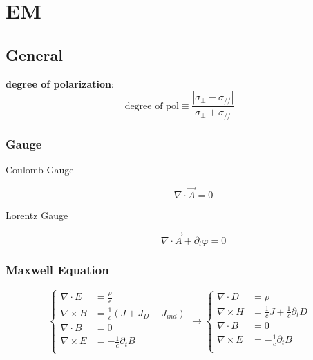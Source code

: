 \section{EM}

\subsection{General}
\textbf{degree of polarization}:    \\
\begin{equation}
    \text{degree of pol} \equiv \frac{|\sigma_{\perp}-\sigma_{//}|}{\sigma_{\perp}+\sigma_{//}}
\end{equation}

\subsubsection{Gauge}
\begin{description}
    \item [Coulomb Gauge]
	\begin{equation}
	    \label{eqn:em::CoulombGauge}
	    \nabla\cdot\vec{A} = 0
	\end{equation}

    \item [Lorentz Gauge]
	\begin{equation}
	    \label{eqn:em::LorentzGauge}
	    \nabla\cdot\vec{A} + \partial_t\varphi = 0
	\end{equation}
\end{description}

\subsubsection{Maxwell Equation}
\begin{equation}
    \label{eqn:Maxwell}
    \left\{
    \begin{aligned}
	\nabla\cdot{E} &= \frac{\rho}{\epsilon}	\\
	\nabla\times{B} &= \frac{1}{c}\left(J + J_D + J_{ind}\right)	\\
	\nabla\cdot{B} &= 0  \\
	\nabla\times{E} &= -\frac{1}{c}\partial_{t}B	\\
    \end{aligned}
    \right.
    \longrightarrow
    \left\{
    \begin{aligned}
	\nabla\cdot{D} &= \rho	\\
	\nabla\times{H} &= \frac{1}{c}J +\frac{1}{c}\partial_{t}D    \\
	\nabla\cdot{B} &= 0  \\
	\nabla\times{E} &= -\frac{1}{c}\partial_{t}B	\\
    \end{aligned}
    \right.
\end{equation}

